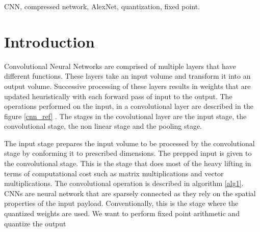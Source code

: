 \documentclass[conference]{IEEEtran}
\begin{document}
\begin{IEEEkeywords}
CNN, compressed network, AlexNet, quantization, fixed point.
\end{IEEEkeywords}
% 
% 




% 
% 
%
\IEEEpeerreviewmaketitle


\section{Introduction}
Convolutional Neural Networks are comprised of multiple layers that have different functions. These layers take an input volume and
transform it into an output volume. Successive processing of these layers results in weights that are updated heuristically with each forward pass of input to the output. The operations performed on the input, in a convolutional layer are described in the figure \ref{cnn_ref} \cite{cs231}.
The stages in the covolutional layer are the input stage, the convolutional stage, the non linear stage and the pooling stage. 

The input stage prepares the input volume to be processed by the convolutional stage by conforming it to prescribed dimensions. The prepped input is given to the convolutional stage. This is the stage that does most of the heavy lifting in terms of computational cost such as matrix multiplications and vector multiplications. The convolutional operation is described in algorithm \ref{alg1}. CNNs are neural network that are sparsely connected as they rely on the spatial properties of the input payload. Conventionally, this is the stage where the quantized weights are used. We want to perform fixed point arithmetic and quantize the output 
\end{document}
